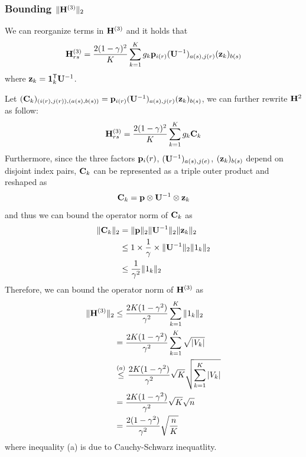 \subsubsection{Bounding $\|\mathbf{{H}}^{(3)}\|_2$} We can reorganize terms in $\mathbf{{H}}^{(3)}$ and it holds that
\begin{equation*}
	\mathbf{{H}}^{(3)}_{rs} = \frac{2(1-\gamma)^2}{K} \sum_{k=1}^{K} g_k \mathbf{{p}}_{i(r)} (\mathbf{{U}}^{-1})_{a(s),j(r)} (\mathbf{{z}}_k)_{b(s)}
\end{equation*}
where $\mathbf{{z}}_k = \mathbf{{1}}_{k}^{\mathsf{T}} \mathbf{{U}}^{-1}$.

Let $(\mathbf{{C}}_k)_{(i(r), j(r)),(a(s), b(s))} = \mathbf{{p}}_{i(r)} (\mathbf{{U}}^{-1})_{a(s), j(r)} (\mathbf{{z}}_k)_{b(s)}$, we can further rewrite $\mathbf{{H}}^{2}$ as follow:
\begin{equation}
	\mathbf{{H}}^{(3)}_{rs} = \frac{2(1-\gamma)^2}{K} \sum_{k=1}^{K} g_k \mathbf{{C}}_k
	\label{eq:H3}
\end{equation}
Furthermore, since the three factors $\mathbf{{p}}_i(r)$, $(\mathbf{{U}}^{-1})_{a(s), j(e)}$, $(\mathbf{{z}}_k)_{b(s)}$ depend on disjoint index pairs, $\mathbf{{C}}_k$ can be represented as a triple outer product and reshaped as 
\begin{equation*}
	\mathbf{{C}}_k = \mathbf{{p}} \otimes \mathbf{{U}}^{-1} \otimes \mathbf{{z}}_k  
\end{equation*}
and thus we can bound the operator norm of $\mathbf{{C}}_k$ as 
\begin{align*}
	\|\mathbf{{C}}_k\|_2  &= \|\mathbf{{p}}\|_2  \|\mathbf{{U}}^{-1}\|_2 \|\mathbf{{z}}_k\|_2 \\
	& \leq 1 \times \frac{1}{\gamma} \times \|\mathbf{{U}}^{-1}\|_2\|1_k\|_2 \\
	& \leq  \frac{1}{\gamma^2} \|1_k\|_2
\end{align*}
Therefore, we can bound the operator norm of $\mathbf{{H}}^{(3)}$ as
\begin{align}
	\label{eq:boundh3}
	\|\Hmatrix^{(3)}\|_2 
	& \leq \frac{2K(1-\gamma^2)}{\gamma^2} \sum_{k=1}^{K}\|1_k\|_2\\ \nonumber
	&= \frac{2K(1-\gamma^2)}{\gamma^2} \sum_{k=1}^{K} \sqrt{|\group_k|} \\ \nonumber
	& \stackrel{(a)}{\leq} \frac{2K(1-\gamma^2)}{\gamma^2}  \sqrt{K} \sqrt{ \sum_{k=1}^{K} |\group_k|} \\ \nonumber
	& = \frac{2K(1-\gamma^2)}{\gamma^2}  \sqrt{K} \sqrt{n} \\ \nonumber
	& = \frac{2(1-\gamma^2)}{\gamma^2}  \sqrt{\frac{n}{K}}
\end{align}
where inequality (a) is due to Cauchy-Schwarz inequatlity.





